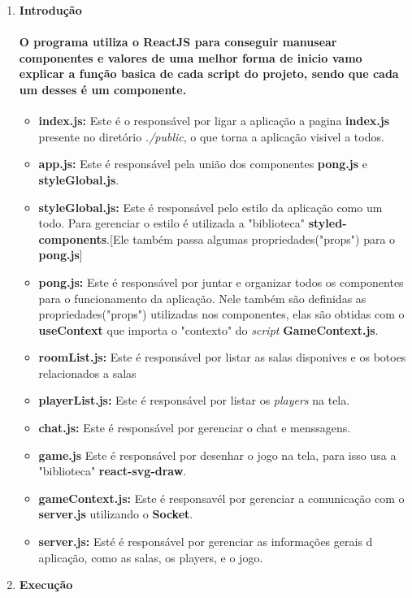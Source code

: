 \documentclass[12pt,openright,oneside,a4paper,brazil,article]{abntex2}
\begin{document}
  \begin{enumerate}
    \item \textbf{Introdução}
    \paragraph*{O programa utiliza o \textbf{ReactJS} para conseguir manusear componentes e valores de uma melhor forma
    de inicio vamo explicar a função basica de cada script do projeto, sendo que cada um desses é um componente.}
    \begin{itemize}
      \item \textbf{index.js:} Este é o responsável por ligar a aplicação a pagina \textbf{index.js}
      presente no diretório \textit{./public}, o que torna a aplicação visivel a todos.
      \item \textbf{app.js:} Este é responsável pela união dos componentes \textbf{pong.js} e \textbf{styleGlobal.js}.
      \item \textbf{styleGlobal.js:} Este é responsável pelo estilo da aplicação como um todo. Para gerenciar o estilo 
      é utilizada a "biblioteca" \textbf{styled-components}.[Ele também passa algumas propriedades("props") para o \textbf{pong.js}]
      \item \textbf{pong.js:} Este é responsável por juntar e organizar todos os componentes para o funcionamento da
      aplicação. Nele também são definidas as propriedades("props") utilizadas nos componentes, elas são obtidas com o 
      \textbf{useContext} que importa o "contexto" do \textit{script} \textbf{GameContext.js}.
      \item \textbf{roomList.js:} Este é responsável por listar as salas disponives e os botoes relacionados a salas
      \item \textbf{playerList.js:} Este é responsável por listar os \textit{players} na tela.
      \item \textbf{chat.js:} Este é responsável por gerenciar o chat e menssagens.
      \item \textbf{game.js} Este é responsável por desenhar o jogo na tela, para isso usa a "biblioteca" \textbf{react-svg-draw}.
      \item \textbf{gameContext.js:} Este é responsavél por gerenciar a comunicação com o \textbf{server.js} utilizando o \textbf{Socket}. 
      \item \textbf{server.js:} Esté  é responsável por gerenciar as informações gerais d aplicação, como as salas, os players, e o jogo.
    \end{itemize}
    \item \textbf{Execução} \\

\end{enumerate}
\end{document}
